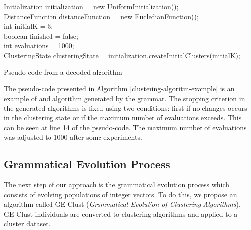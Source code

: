 \documentclass[conference,compsoc]{IEEEtran}
\begin{document}
\begin{algorithm}[!htb]
	\label{clustering-algoritm-example}
	Initialization initialization = new UniformInitialization(); \\
	DistanceFunction distanceFunction = new EucledianFunction(); \\
	int initialK = 8; \\
	boolean finished = false; \\
	int evaluations = 1000;\\
	ClusteringState 
	clusteringState = initialization.createInitialClusters(initialK); \\
	\caption{Pseudo code from a decoded algorithm}
\end{algorithm}


The pseudo-code presented in Algorithm \ref{clustering-algoritm-example} is an example of and algorithm generated by the grammar. The stopping criterion in the generated algorithms is fixed using two conditions: first if no changes occurs in the clustering state or if the maximum number of evaluations exceeds. This can be seen at line 14 of the pseudo-code. The maximum number of evaluations was adjusted to 1000 after some experiments.


\subsection{Grammatical Evolution Process}


The next step of our approach is the grammatical evolution process which consists of evolving populations of integer vectors. To do this, we propose an algorithm called GE-Clust ({\it Grammatical Evolution of Clustering Algorithms}). GE-Clust individuals are converted to clustering algorithms and applied to a cluster dataset.
\end{document}

